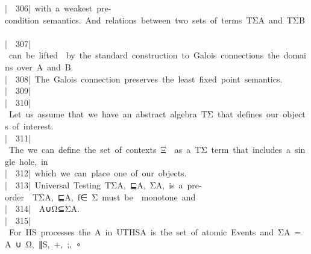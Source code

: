 \documentclass{article}
\newcommand{\syntaxCOMMENTA}[1]{\textcolor[rgb]{0.8,0.0,0.0}{#1}}
\newcommand{\syntaxCOMMENTA}[1]{\textcolor[rgb]{0.8,0.0,0.0}{#1}}
\newcommand{\syntaxCOMMENTA}[1]{\textcolor[rgb]{0.8,0.0,0.0}{#1}}
\newcommand{\syntaxCOMMENTA}[1]{\textcolor[rgb]{0.8,0.0,0.0}{\textbf{#1}}}
\newcommand{\syntaxCOMMENTA}[1]{\textcolor[rgb]{0.8,0.0,0.0}{#1}}
\newcommand{\syntaxCOMMENTA}[1]{\textcolor[rgb]{0.8,0.0,0.0}{#1}}
\newcommand{\syntaxCOMMENTA}[1]{\textcolor[rgb]{0.0,0.0,0.0}{#1}}
\newcommand{\gutter}[1]{\textcolor[rgb]{0,0,0}{{|}#1}}
\newcommand{\gutterH}[1]{\textcolor[rgb]{1,0,0}{{|}#1}}
\begin{document}
\gutter{\ \ 306{|}\ }\syntaxCOMMENTA{with{\ }a{\ }weakest{\ }pre{-}condition{\ }semantics.{\ }And{\ }relations{\ }between{\ }two{\ }sets{\ }of{\ }terms{\ }T\usebox{\underscorebox}Σ\usebox{\underscorebox}A{\ }and{\ }T\usebox{\underscorebox}Σ\usebox{\underscorebox}B{\ }{\ }}\hspace*{\fill}\\
\gutter{\ \ 307{|}\ }\syntaxCOMMENTA{can{\ }be{\ }lifted{\ }{\ }by{\ }the{\ }standard{\ }construction{\ }to{\ }Galois{\ }connections{\ }the{\ }domains{\ }over{\ }A{\ }and{\ }B.{\ }}\hspace*{\fill}\\
\gutter{\ \ 308{|}\ }\syntaxCOMMENTA{The{\ }Galois{\ }connection{\ }preserves{\ }the{\ }least{\ }fixed{\ }point{\ }semantics.}\hspace*{\fill}\\
\gutter{\ \ 309{|}\ }\syntaxCOMMENTA{{\ }}\hspace*{\fill}\\
\gutterH{\ \ 310{|}\ }\syntaxCOMMENTA{Let{\ }us{\ }assume{\ }that{\ }we{\ }have{\ }an{\ }abstract{\ }algebra{\ }T\usebox{\underscorebox}Σ{\ }that{\ }defines{\ }our{\ }objects{\ }of{\ }interest.}\hspace*{\fill}\\
\gutter{\ \ 311{|}\ }\syntaxCOMMENTA{The{\ }we{\ }can{\ }define{\ }the{\ }set{\ }of{\ }contexts{\ }Ξ{\ }{\ }as{\ }a{\ }T\usebox{\underscorebox}Σ{\ }term{\ }that{\ }includes{\ }a{\ }single{\ }hole,{\ }\usebox{\underscorebox}{\ }in{\ }}\hspace*{\fill}\\
\gutter{\ \ 312{|}\ }\syntaxCOMMENTA{which{\ }we{\ }can{\ }place{\ }one{\ }of{\ }our{\ }objects.}\hspace*{\fill}\\
\gutter{\ \ 313{|}\ }\syntaxCOMMENTA{Universal{\ }Testing{\ }\usebox{\lessthan}T\usebox{\underscorebox}Σ\usebox{\underscorebox}A,{\ }⊑\usebox{\underscorebox}A,{\ }Σ\usebox{\underscorebox}A\usebox{\greaterthan},{\ }is{\ }a{\ }pre{-}order{\ }{\ }\usebox{\lessthan}T\usebox{\underscorebox}Σ\usebox{\underscorebox}A,{\ }⊑\usebox{\underscorebox}A\usebox{\greaterthan},{\ }f∈{\ }Σ{\ }must{\ }be{\ }{\ }monotone{\ }and{\ }}\hspace*{\fill}\\
\gutter{\ \ 314{|}\ }\syntaxCOMMENTA{{\ }A∪\usebox{\opencurlybracket}Ω\usebox{\closecurlybracket}⊆Σ\usebox{\underscorebox}A.}\hspace*{\fill}\\
\gutterH{\ \ 315{|}\ }\syntaxCOMMENTA{For{\ }HS{\ }processes{\ }the{\ }A{\ }in{\ }UTHS\usebox{\underscorebox}A{\ }is{\ }the{\ }set{\ }of{\ }atomic{\ }Events{\ }and{\ }Σ\usebox{\underscorebox}A{\ }={\ }A{\ }∪{\ }\usebox{\opencurlybracket}Ω,{\ }∥\usebox{\underscorebox}S,{\ }+,{\ };,{\ }∘\usebox{\closecurlybracket}{\ }}\hspace*{\fill}\\
\end{document}
